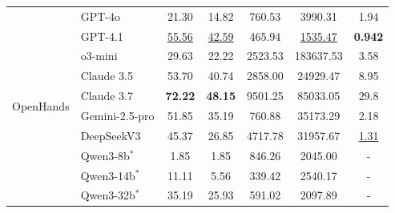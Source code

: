 \documentclass[letterpaper]{article} %
\begin{document}
\begin{table}[!t]
\begin{tabular}{llccccc}
\midrule
\multirow{12}{*}{OpenHands}
& \cellcolor{gray!12}GPT-4o       & 
\cellcolor{gray!12}21.30        & 
\cellcolor{gray!12}14.82        & 
\cellcolor{gray!12}760.53       & 
\cellcolor{gray!12}3990.31            & 
\cellcolor{gray!12}1.94             
\\
& \cellcolor{gray!32}GPT-4.1      & \cellcolor{gray!32}\underline{55.56} & \cellcolor{gray!32}\underline{42.59} & \cellcolor{gray!32}465.94   & \cellcolor{gray!32}\underline{1535.47}            & \cellcolor{gray!32}\textbf{0.942} 
\\
& \cellcolor{gray!16}o3-mini      & \cellcolor{gray!16}29.63 & \cellcolor{gray!16}22.22 &
\cellcolor{gray!16}2523.53 &
\cellcolor{gray!16}183637.53 & 
\cellcolor{gray!16}3.58 
\\
& \cellcolor{gray!32}Claude 3.5    & 
\cellcolor{gray!32}53.70        & 
\cellcolor{gray!32}40.74        & 
\cellcolor{gray!32}2858.00      & 
\cellcolor{gray!32}24929.47           & 
\cellcolor{gray!32}8.95            
\\
& \cellcolor{gray!36}Claude 3.7    & \cellcolor{gray!36}\textbf{72.22} & \cellcolor{gray!36}\textbf{48.15} & \cellcolor{gray!36}9501.25 & 
\cellcolor{gray!36}85033.05  & 
\cellcolor{gray!36}29.8        
\\
& \cellcolor{gray!24}Gemini-2.5-pro   & 
\cellcolor{gray!24}51.85        & 
\cellcolor{gray!24}35.19        & 
\cellcolor{gray!24}760.88       & 
\cellcolor{gray!24}35173.29     & 
\cellcolor{gray!24}2.18   
\\
& \cellcolor{gray!20}DeepSeekV3   & 
\cellcolor{gray!20}45.37        & 
\cellcolor{gray!20}26.85        & 
\cellcolor{gray!20}4717.78      & 
\cellcolor{gray!20}31957.67           & 
\cellcolor{gray!20}\underline{1.31}  
\\
& \cellcolor{gray!4}Qwen3-8b$^{*}$        & \cellcolor{gray!4}1.85       
& \cellcolor{gray!4}1.85        
& \cellcolor{gray!4}846.26    
& \cellcolor{gray!4}2045.00             
& \cellcolor{gray!4}-                
\\
& \cellcolor{gray!8}Qwen3-14b$^{*}$        
& \cellcolor{gray!8}11.11        
& \cellcolor{gray!8}5.56       
& \cellcolor{gray!8}339.42      
& \cellcolor{gray!8}2540.17             
& \cellcolor{gray!8}-                
\\
& \cellcolor{gray!20}Qwen3-32b$^{*}$    
& \cellcolor{gray!20}35.19        
& \cellcolor{gray!20}25.93        
& \cellcolor{gray!20}591.02   
& \cellcolor{gray!20}2097.89         
& \cellcolor{gray!20}-                
\\

\end{tabular}
\end{table}
\end{document}
